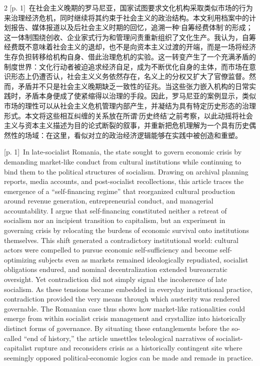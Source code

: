 \documentclass[10pt,a4paper]{article}
\begin{document}
\begin{paracol}{2}
{\scriptsize\color{gray} [p. 1]}\ 在社会主义晚期的罗马尼亚，国家试图要求文化机构采取类似市场的行为来治理经济危机，同时继续将其约束于社会主义的政治结构。本文利用档案中的计划报告、媒体报道以及后社会主义时期的回忆，追溯一种‘自筹经费体制’的形成；这一体制围绕创收、企业家式行为和管理问责重新组织了文化生产。我认为，自筹经费既不意味着社会主义的退却，也不是向资本主义过渡的开端，而是一场将经济生存负担转移给机构自身、借此治理危机的实验。这一转变产生了一个充满矛盾的制度世界：文化行动者被迫追求经济自足，成为不断优化自身的主体，而市场在意识形态上仍遭否认，社会主义义务依然存在，名义上的分权又扩大了官僚监督。然而，矛盾并不只是社会主义晚期缺乏一致性的征兆。当这些张力嵌入机构的日常实践时，矛盾本身便成了使紧缩得以治理的手段。因此，罗马尼亚的案例显示，类似市场的理性可以从社会主义危机管理内部产生，并凝结为具有特定历史形态的治理形式。本文将这些相互纠缠的关系放在所谓‘历史终结’之前考察，以此动摇将社会主义与资本主义描述为目的论式断裂的叙事，并重新把危机理解为一个具有历史偶然性的场域：在这里，看似对立的政治经济逻辑能够在实践中被创造和重塑。\par
\switchcolumn
{\scriptsize\color{gray} [p. 1]}\ In late-socialist Romania, the state sought to govern economic crisis by demanding market-like conduct from cultural institutions while continuing to bind them to the political structures of socialism. Drawing on archival planning reports, media accounts, and post-socialist recollections, this article traces the emergence of a “self-financing regime” that reorganized cultural production around revenue generation, entrepreneurial conduct, and managerial accountability. I argue that self-financing constituted neither a retreat of socialism nor an incipient transition to capitalism, but an experiment in governing crisis by relocating the burdens of economic survival onto institutions themselves. This shift generated a contradictory institutional world: cultural actors were compelled to pursue economic self-sufficiency and become self-optimizing subjects even as markets remained ideologically repudiated, socialist obligations endured, and nominal decentralization extended bureaucratic oversight. Yet contradiction did not simply signal the incoherence of late socialism. As these tensions became embedded in everyday institutional practice, contradiction provided the very means through which austerity was rendered governable. The Romanian case thus shows how market-like rationalities could emerge from within socialist crisis management and crystallize into historically distinct forms of governance. By situating these entanglements before the so-called “end of history,” the article unsettles teleological narratives of socialist-capitalist rupture and reconsiders crisis as a historically contingent site where seemingly opposed political-economic logics can be made and remade in practice.\par
\switchcolumn*
\end{paracol}
\end{document}
